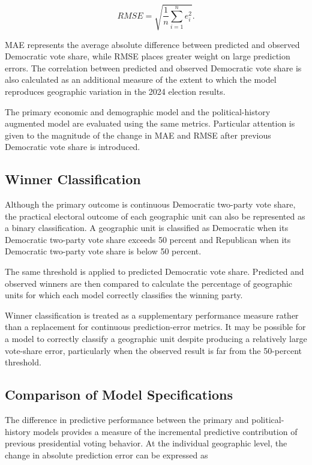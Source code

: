 \documentclass[12pt]{article}
\begin{document}
	\begin{equation}
		RMSE
		=
		\sqrt{
			\frac{1}{n}
			\sum_{i=1}^{n}
			e_i^2
		}.
	\end{equation}
	
	MAE represents the average absolute difference between predicted and
	observed Democratic vote share, while RMSE places greater weight on
	large prediction errors. The correlation between predicted and observed
	Democratic vote share is also calculated as an additional measure of
	the extent to which the model reproduces geographic variation in the
	2024 election results.
	
	The primary economic and demographic model and the
	political-history augmented model are evaluated using the same
	metrics. Particular attention is given to the magnitude of the change
	in MAE and RMSE after previous Democratic vote share is introduced.
	
	
	\subsection{Winner Classification}
	
	Although the primary outcome is continuous Democratic two-party vote
	share, the practical electoral outcome of each geographic unit can also
	be represented as a binary classification. A geographic unit is
	classified as Democratic when its Democratic two-party vote share
	exceeds 50 percent and Republican when its Democratic two-party vote
	share is below 50 percent.
	
	The same threshold is applied to predicted Democratic vote share.
	Predicted and observed winners are then compared to calculate the
	percentage of geographic units for which each model correctly
	classifies the winning party.
	
	Winner classification is treated as a supplementary performance
	measure rather than a replacement for continuous prediction-error
	metrics. It may be possible for a model to correctly classify a geographic unit despite
	producing a relatively large vote-share error, particularly when the
	observed result is far from the 50-percent threshold.
	
	
	\subsection{Comparison of Model Specifications}
	
	The difference in predictive performance between the primary and
	political-history models provides a measure of the incremental
	predictive contribution of previous presidential voting behavior. At
	the individual geographic level, the change in absolute prediction
	error can be expressed as
	
\end{document}
